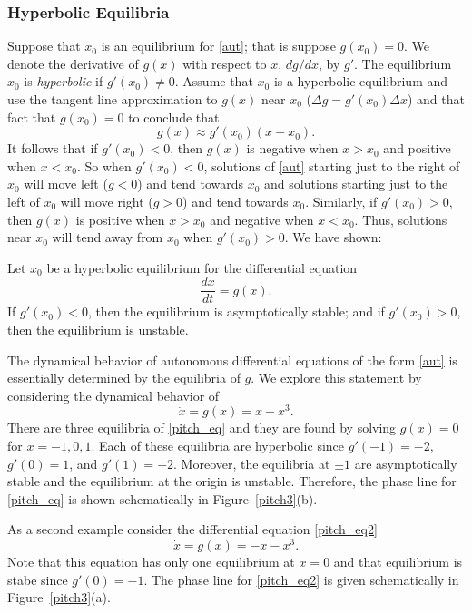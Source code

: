 \documentclass{ximera}
\begin{document}
\subsubsection*{Hyperbolic Equilibria}

Suppose that $x_0$ is an equilibrium for \eqref{aut}; that is suppose
$g(x_0)=0$.  We denote the derivative of $g(x)$ with respect to $x$, 
$dg/dx$, by $g'$.  The equilibrium $x_0$ is 
{\em hyperbolic\/} 
if $g'(x_0)\neq 0$.  Assume that $x_0$ is a hyperbolic equilibrium and use
the tangent line approximation to $g(x)$ near $x_0$
($\Delta g = g'(x_0)\Delta x$) and that fact that $g(x_0)=0$ to conclude that
\[
g(x) \approx g'(x_0)(x-x_0).
\]
It follows that if $g'(x_0)<0$, then $g(x)$ is negative when
$x>x_0$ and positive when $x<x_0$.  So when $g'(x_0)<0$,
solutions of \eqref{aut} starting just to the right of $x_0$ will
move left ($g<0$) and tend towards $x_0$ and solutions starting
just to the left of $x_0$ will move right ($g>0$) and tend
towards $x_0$.  Similarly, if $g'(x_0)>0$, then $g(x)$ is positive
when $x>x_0$ and negative when $x<x_0$.  Thus, solutions near $x_0$ 
will tend away from $x_0$ when $g'(x_0)>0$.    We  have shown:
\begin{theorem} \label{T:stability1}
Let $x_0$ be a hyperbolic equilibrium for the differential equation
\[
\frac{dx}{dt} = g(x).
\]
If $g'(x_0)<0$, then the equilibrium is asymptotically stable;
and if $g'(x_0)>0$, then the equilibrium is unstable.
\end{theorem}  

The dynamical behavior of autonomous differential equations of
the form \eqref{aut} is essentially determined by the equilibria
of $g$.  We explore this statement by considering the dynamical 
behavior of 
\begin{equation} \label{pitch_eq}
	\dot{x} = g(x) = x-x^3.
\end{equation}
There are three equilibria of \eqref{pitch_eq} and they are found 
by solving $g(x) = 0$ for $x = -1,0,1$. Each of these equilibria are 
hyperbolic since $g'(-1) = -2$, $g'(0) = 1$, and $g'(1) = -2$.  Moreover, 
the equilibria at $\pm 1$ are asymptotically stable and the equilibrium 
at the origin is unstable.  Therefore, the phase line for \eqref{pitch_eq}
is shown schematically in Figure~\ref{pitch3}(b).

As a second example consider the differential equation \eqref{pitch_eq2}
\begin{equation} \label{pitch_eq2}
	\dot{x} = g(x) = -x-x^3.
\end{equation}
Note that this equation has only one equilibrium at $x=0$ and that 
equilibrium is stabe since $g'(0) = -1$.  The phase line for \eqref{pitch_eq2}
is given schematically in Figure~\ref{pitch3}(a).
\end{document}
